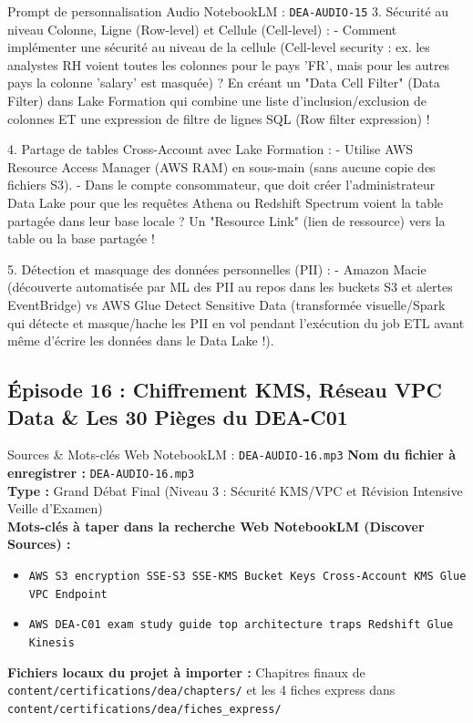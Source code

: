 \documentclass[11pt,a4paper]{article}
\begin{document}
\begin{promptbox}{Prompt de personnalisation Audio NotebookLM : \texttt{DEA-AUDIO-15}}
3. Sécurité au niveau Colonne, Ligne (Row-level) et Cellule (Cell-level) :
- Comment implémenter une sécurité au niveau de la cellule (Cell-level security : ex. les analystes RH voient toutes les colonnes pour le pays 'FR', mais pour les autres pays la colonne 'salary' est masquée) ? En créant un "Data Cell Filter" (Data Filter) dans Lake Formation qui combine une liste d'inclusion/exclusion de colonnes ET une expression de filtre de lignes SQL (Row filter expression) !

4. Partage de tables Cross-Account avec Lake Formation :
- Utilise AWS Resource Access Manager (AWS RAM) en sous-main (sans aucune copie des fichiers S3).
- Dans le compte consommateur, que doit créer l'administrateur Data Lake pour que les requêtes Athena ou Redshift Spectrum voient la table partagée dans leur base locale ? Un "Resource Link" (lien de ressource) vers la table ou la base partagée !

5. Détection et masquage des données personnelles (PII) :
- Amazon Macie (découverte automatisée par ML des PII au repos dans les buckets S3 et alertes EventBridge) vs AWS Glue Detect Sensitive Data (transformée visuelle/Spark qui détecte et masque/hache les PII en vol pendant l'exécution du job ETL avant même d'écrire les données dans le Data Lake !).
\end{promptbox}

\subsection{Épisode 16 : Chiffrement KMS, Réseau VPC Data \& Les 30 Pièges du DEA-C01}
\begin{sourcebox}{Sources \& Mots-clés Web NotebookLM : \texttt{DEA-AUDIO-16.mp3}}
\textbf{Nom du fichier à enregistrer :} \texttt{DEA-AUDIO-16.mp3}\\
\textbf{Type :} Grand Débat Final (Niveau 3 : Sécurité KMS/VPC et Révision Intensive Veille d'Examen)\\
\textbf{Mots-clés à taper dans la recherche Web NotebookLM (Discover Sources) :}
\begin{itemize}[noitemsep]
    \item \texttt{AWS S3 encryption SSE-S3 SSE-KMS Bucket Keys Cross-Account KMS Glue VPC Endpoint}
    \item \texttt{AWS DEA-C01 exam study guide top architecture traps Redshift Glue Kinesis}
\end{itemize}
\textbf{Fichiers locaux du projet à importer :}
Chapitres finaux de \texttt{content/certifications/dea/chapters/} et les 4 fiches express dans \texttt{content/certifications/dea/fiches_express/}
\end{sourcebox}
\end{document}

